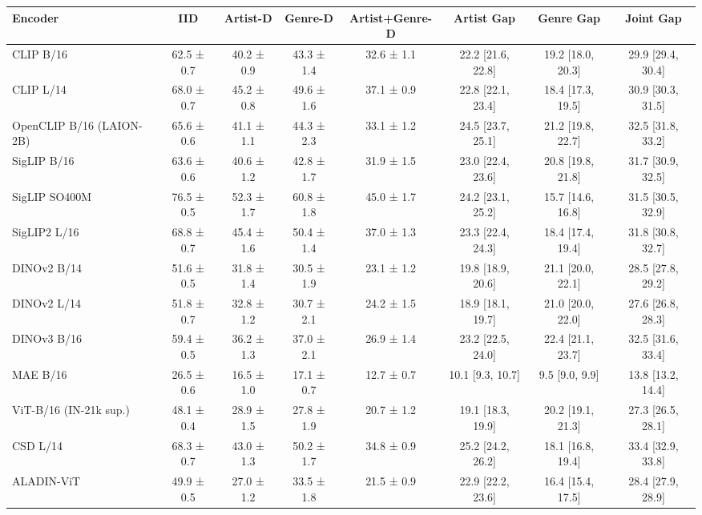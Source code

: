 \begin{tabular}{lccccccc}
\toprule
Encoder & IID & Artist-D & Genre-D & Artist+Genre-D & Artist Gap & Genre Gap & Joint Gap \\
\midrule
CLIP B/16 & 62.5 ± 0.7 & 40.2 ± 0.9 & 43.3 ± 1.4 & 32.6 ± 1.1 & 22.2 [21.6, 22.8] & 19.2 [18.0, 20.3] & 29.9 [29.4, 30.4] \\
CLIP L/14 & 68.0 ± 0.7 & 45.2 ± 0.8 & 49.6 ± 1.6 & 37.1 ± 0.9 & 22.8 [22.1, 23.4] & 18.4 [17.3, 19.5] & 30.9 [30.3, 31.5] \\
OpenCLIP B/16 (LAION-2B) & 65.6 ± 0.6 & 41.1 ± 1.1 & 44.3 ± 2.3 & 33.1 ± 1.2 & 24.5 [23.7, 25.1] & 21.2 [19.8, 22.7] & 32.5 [31.8, 33.2] \\
SigLIP B/16 & 63.6 ± 0.6 & 40.6 ± 1.2 & 42.8 ± 1.7 & 31.9 ± 1.5 & 23.0 [22.4, 23.6] & 20.8 [19.8, 21.8] & 31.7 [30.9, 32.5] \\
SigLIP SO400M & 76.5 ± 0.5 & 52.3 ± 1.7 & 60.8 ± 1.8 & 45.0 ± 1.7 & 24.2 [23.1, 25.2] & 15.7 [14.6, 16.8] & 31.5 [30.5, 32.9] \\
SigLIP2 L/16 & 68.8 ± 0.7 & 45.4 ± 1.6 & 50.4 ± 1.4 & 37.0 ± 1.3 & 23.3 [22.4, 24.3] & 18.4 [17.4, 19.4] & 31.8 [30.8, 32.7] \\
DINOv2 B/14 & 51.6 ± 0.5 & 31.8 ± 1.4 & 30.5 ± 1.9 & 23.1 ± 1.2 & 19.8 [18.9, 20.6] & 21.1 [20.0, 22.1] & 28.5 [27.8, 29.2] \\
DINOv2 L/14 & 51.8 ± 0.7 & 32.8 ± 1.2 & 30.7 ± 2.1 & 24.2 ± 1.5 & 18.9 [18.1, 19.7] & 21.0 [20.0, 22.0] & 27.6 [26.8, 28.3] \\
DINOv3 B/16 & 59.4 ± 0.5 & 36.2 ± 1.3 & 37.0 ± 2.1 & 26.9 ± 1.4 & 23.2 [22.5, 24.0] & 22.4 [21.1, 23.7] & 32.5 [31.6, 33.4] \\
MAE B/16 & 26.5 ± 0.6 & 16.5 ± 1.0 & 17.1 ± 0.7 & 12.7 ± 0.7 & 10.1 [9.3, 10.7] & 9.5 [9.0, 9.9] & 13.8 [13.2, 14.4] \\
ViT-B/16 (IN-21k sup.) & 48.1 ± 0.4 & 28.9 ± 1.5 & 27.8 ± 1.9 & 20.7 ± 1.2 & 19.1 [18.3, 19.9] & 20.2 [19.1, 21.3] & 27.3 [26.5, 28.1] \\
CSD L/14 & 68.3 ± 0.7 & 43.0 ± 1.3 & 50.2 ± 1.7 & 34.8 ± 0.9 & 25.2 [24.2, 26.2] & 18.1 [16.8, 19.4] & 33.4 [32.9, 33.8] \\
ALADIN-ViT & 49.9 ± 0.5 & 27.0 ± 1.2 & 33.5 ± 1.8 & 21.5 ± 0.9 & 22.9 [22.2, 23.6] & 16.4 [15.4, 17.5] & 28.4 [27.9, 28.9] \\
\bottomrule
\end{tabular}
